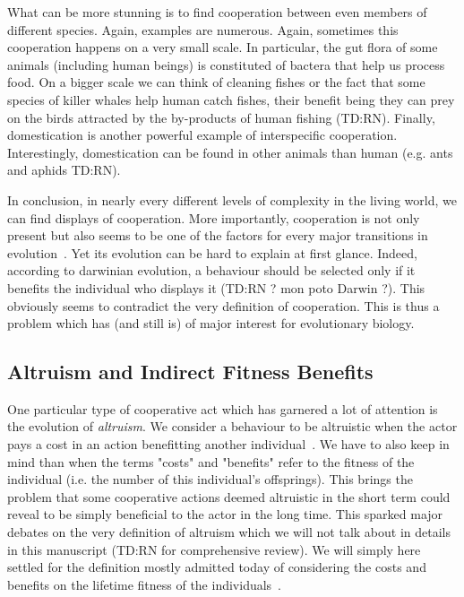     What can be more stunning is to find cooperation between even members of different species. Again, examples are numerous. Again, sometimes this cooperation happens on a very small scale. In particular, the gut flora of some animals (including human beings) is constituted of bactera that help us process food. On a bigger scale we can think of cleaning fishes or the fact that some species of killer whales help human catch fishes, their benefit being they can prey on the birds attracted by the by-products of human fishing (TD:RN). Finally, domestication is another powerful example of interspecific cooperation. Interestingly, domestication can be found in other animals than human (e.g. ants and aphids TD:RN).

    In conclusion, in nearly every different levels of complexity in the living world, we can find displays of cooperation. More importantly, cooperation is not only present but also seems to be one of the factors for every major transitions in evolution~\cite{Szathmary1995}. Yet its evolution can be hard to explain at first glance. Indeed, according to darwinian evolution, a behaviour should be selected only if it benefits the individual who displays it (TD:RN ? mon poto Darwin ?). This obviously seems to contradict the very definition of cooperation. This is thus a problem which has (and still is) of major interest for evolutionary biology.



  \subsection{Altruism and Indirect Fitness Benefits}

    One particular type of cooperative act which has garnered a lot of attention is the evolution of \emph{altruism}. We consider a behaviour to be altruistic when the actor pays a cost in an action benefitting another individual~\cite{Hamilton1964, West2006}. We have to also keep in mind than when the terms "costs" and "benefits" refer to the fitness of the individual (i.e. the number of this individual's offsprings). This brings the problem that some cooperative actions deemed altruistic in the short term could reveal to be simply beneficial to the actor in the long time. This sparked major debates on the very definition of altruism which we will not talk about in details in this manuscript (TD:RN for comprehensive review). We will simply here settled for the definition mostly admitted today of considering the costs and benefits on the lifetime fitness of the individuals~\cite{West2006, Keller2006}.

